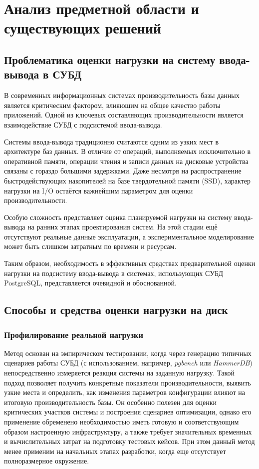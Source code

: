 \section{Анализ предметной области и существующих решений}

\subsection{Проблематика оценки нагрузки на систему ввода-вывода в СУБД}

В современных информационных системах производительность базы данных является критическим фактором, влияющим на общее качество работы приложений. Одной из ключевых составляющих производительности является взаимодействие СУБД с подсистемой ввода-вывода. \cite{vershinin2023optimization}

Системы ввода-вывода традиционно считаются одним из узких мест в архитектуре баз данных. В отличие от операций, выполняемых исключительно в оперативной памяти, операции чтения и записи данных на дисковые устройства связаны с гораздо большими задержками. Даже несмотря на распространение быстродействующих накопителей на базе твердотельной памяти (SSD), характер нагрузки на I/O остаётся важнейшим параметром для оценки производительности. \cite{hellerstein2007architecture} \cite{malykh2022migration}

Особую сложность представляет оценка планируемой нагрузки на систему ввода-вывода на ранних этапах проектирования систем. На этой стадии ещё отсутствуют реальные данные эксплуатации, а экспериментальное моделирование может быть слишком затратным по времени и ресурсам.

Таким образом, необходимость в эффективных средствах предварительной оценки нагрузки на подсистему ввода-вывода в системах, использующих СУБД PostgreSQL, представляется очевидной и обоснованной.


\subsection{Способы и средства оценки нагрузки на диск} 


\subsubsection{Профилирование реальной нагрузки}
Метод основан на эмпирическом тестировании, когда через генерацию типичных сценариев работы СУБД (с использованием, например, \textit{pgbench} или \textit{HammerDB}) непосредственно измеряется реакция системы на заданную нагрузку. Такой подход позволяет получить конкретные показатели производительности, выявить узкие места и определить, как изменения параметров конфигурации влияют на итоговую производительность базы. Он особенно полезен для оценки критических участков системы и построения сценариев оптимизации, однако его применение обременено необходимостью иметь готовую и соответствующим образом настроенную инфраструктуру, а также требует значительных временных и вычислительных затрат на подготовку тестовых кейсов. При этом данный метод менее применим на начальных этапах разработки, когда еще отсутствует полноразмерное окружение.

